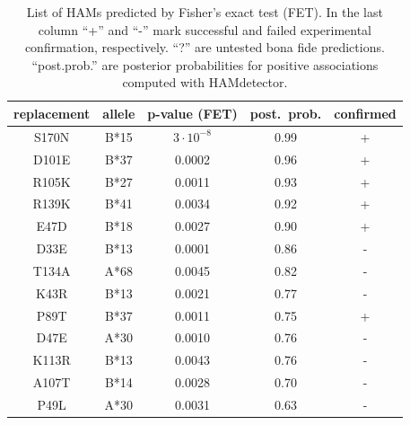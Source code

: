 \documentclass{bioinfo}
\begin{document}
\begin{table}[h!]
  \caption{List of HAMs predicted by Fisher's exact test (FET). In the last column ``+'' and ``-'' mark successful and failed experimental confirmation, respectively. ``?'' are untested bona fide predictions. ``post.prob.'' are posterior probabilities for positive associations computed with HAMdetector.}
  \vspace{0.5cm}
  \begin{tabular}{c|c|c|c|c}
  replacement & allele  & p-value (FET) & post.~prob. & confirmed \\
  \hline
  S170N       & B*15 & $3\cdot10^{-8}$      & 0.99                                & +                        \\
  D101E       & B*37 & 0.0002                        & 0.96                                & +                        \\
  R105K       & B*27 & 0.0011                        & 0.93                                & +                        \\
  R139K       & B*41 & 0.0034                        & 0.92                                & +                        \\
  E47D        & B*18 & 0.0027                        & 0.90                                & +                        \\
  D33E        & B*13 & 0.0001                        & 0.86                                & -                        \\
  T134A       & A*68 & 0.0045                        & 0.82                                & -                        \\
  K43R        & B*13 & 0.0021                        & 0.77                                & -                        \\
  P89T        & B*37 & 0.0011                        & 0.75                                & +                        \\
  D47E        & A*30 & 0.0010                        & 0.76                                & -                        \\
  K113R       & B*13 & 0.0043                        & 0.76                                & -                        \\
  A107T       & B*14 & 0.0028                        & 0.70                                & -                        \\
  P49L        & A*30 & 0.0031                        & 0.63                                & -                        \\

\end{tabular}
\end{table}
\end{document}
